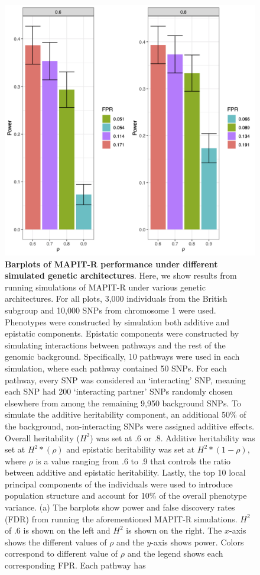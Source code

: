 \documentclass[10pt]{article}
\begin{document}
\begin{figure}[htbp]
\centering
\includegraphics[scale=.8]{Images/Supp/Greg/power_split.png}
\caption{\textbf{Barplots of MAPIT-R performance under different simulated genetic architectures}. Here, we show results from running simulations of MAPIT-R under various genetic architectures. For all plots, 3,000 individuals from the British subgroup and 10,000 SNPs from chromosome 1 were used. Phenotypes were constructed by simulation both additive and epistatic components. Epistatic components were constructed by simulating interactions between pathways and the rest of the genomic background. Specifically, 10 pathways were used in each simulation, where each pathway contained 50 SNPs. For each pathway, every SNP was considered an `interacting' SNP, meaning each SNP had 200 `interacting partner' SNPs randomly chosen elsewhere from among the remaining 9,950 background SNPs. To simulate the additive heritability component, an additional 50\% of the background, non-interacting SNPs were assigned additive effects. Overall heritability ($H^2$) was set at .6 or .8. Additive heritability was set at $H^2*(\rho)$ and epistatic heritability was set at $H^2*(1-\rho)$, where $\rho$ is a value ranging from .6 to .9 that controls the ratio between additive and epistatic heritability. Lastly, the top 10 local principal components of the individuals were used to introduce population structure and account for 10\% of the overall phenotype variance. (a) The barplots show power and false discovery rates (FDR) from running the aforementioned MAPIT-R simulations. $H^2$ of .6 is shown on the left and $H^2$ is shown on the right. The $x$-axis shows the different values of $\rho$ and the $y$-axis shows power. Colors correspond to different value of $\rho$ and the legend shows each corresponding FPR.
Each pathway has
}
\label{InterPath-Supp-Figure-Greg-Simulations-part1}
\end{figure}
\clearpage
\end{document}
